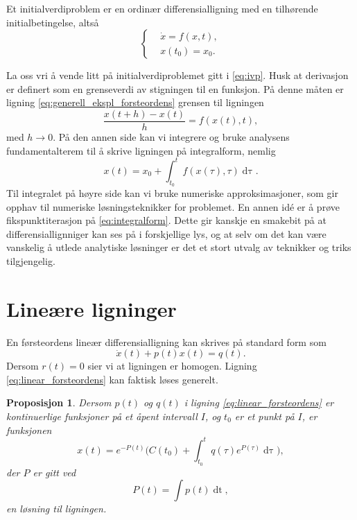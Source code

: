 \documentclass{article}
\theoremstyle{plain}
\newtheorem{prop}[thm]{Proposisjon}
\theoremstyle{definition}
\theoremstyle{remark}
\newenvironment{defn}
{\pushQED{\qed}\renewcommand{\qedsymbol}{$\triangle$}\defnx}
{\popQED\enddefnx}
\newcommand{\diff}[1]{\mathop{d#1}}
\newcommand{\fcn}{x}
\newcommand{\expfcn}[1]{e^{#1}}
\newcommand{\biggparanth}[1]{\bigg(#1\bigg)}
\begin{document}
\begin{defn} \label{def:ivp}
    Et initialverdiproblem er en ordinær differensialligning med en tilhørende initialbetingelse, altså
    \begin{equation} \label{eq:ivp}
        \left\{
        \begin{aligned}
             & \dot{\fcn} = f(\fcn, t), \\
             & \fcn(t_0) = \fcn_0.
        \end{aligned}
        \right.
    \end{equation}
\end{defn}

La oss vri å vende litt på initialverdiproblemet gitt i \eqref{eq:ivp}. Husk at derivasjon er definert som en grenseverdi av stigningen til en funksjon. På denne måten er ligning \eqref{eq:generell_ekspl_forsteordens} grensen til ligningen
\begin{equation*}
    \frac{\fcn(t + h) - \fcn(t)}{h} = f(\fcn(t), t),
\end{equation*}
med $h \rightarrow 0$. På den annen side kan vi integrere og bruke analysens fundamentalterem til å skrive ligningen på integralform, nemlig
\begin{equation} \label{eq:integralform}
    \fcn(t) = \fcn_0 + \int_{t_0}^{t} f(\fcn(\tau), \tau) \diff{\tau}.
\end{equation}
Til integralet på høyre side kan vi bruke numeriske approksimasjoner, som gir opphav til numeriske løsningsteknikker for problemet. En annen idé er å prøve fikspunktiterasjon på \eqref{eq:integralform}. Dette gir kanskje en smakebit på at differensiallignniger kan ses på i forskjellige lys, og at selv om det kan være vanskelig å utlede analytiske løsninger er det et stort utvalg av teknikker og triks tilgjengelig.


\section*{Lineære ligninger}

En førsteordens lineær differensialligning kan skrives på standard form som
\begin{equation} \label{eq:linear_forsteordens}
    \dot{\fcn}(t) + p(t) \fcn(t) = q(t).
\end{equation}
Dersom $r(t) = 0$ sier vi at ligningen er homogen. Ligning \eqref{eq:linear_forsteordens} kan faktisk løses generelt.

\begin{prop} \label{prop:lineær_løsn}
    Dersom $p(t)$ og $q(t)$ i ligning \eqref{eq:linear_forsteordens} er kontinuerlige funksjoner på et åpent intervall $I$, og $t_0$ er et punkt på $I$, er funksjonen
    \begin{equation} \label{eq:generell_losn_linear}
        \fcn(t) = \expfcn{-P(t)} \biggparanth{ C(t_0) + \int_{t_0}^t q(\tau) \expfcn{P(\tau)} \diff{\tau}},
    \end{equation}
    der $P$ er gitt ved
    \begin{equation*}
        P(t) = \int p(t) \diff{t},
    \end{equation*}
    en løsning til ligningen.
\end{prop}
\end{document}
